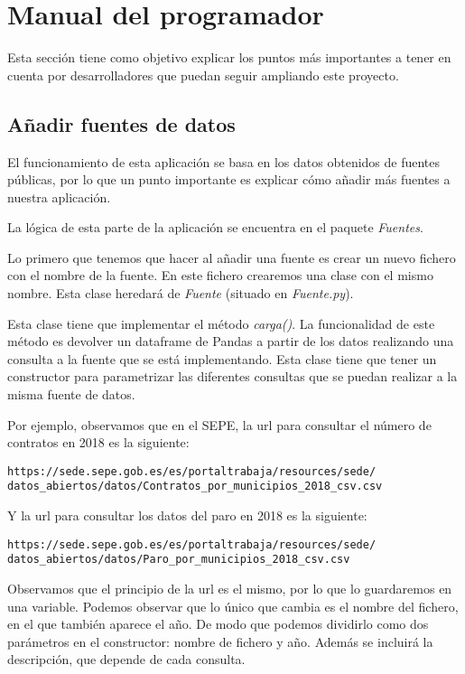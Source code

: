 \section{Manual del programador}

Esta sección tiene como objetivo explicar los puntos más importantes a tener en cuenta por desarrolladores que puedan seguir ampliando este proyecto.

\subsection{Añadir fuentes de datos}

El funcionamiento de esta aplicación se basa en los datos obtenidos de fuentes públicas, por lo que un punto importante es explicar cómo añadir más fuentes a nuestra aplicación.

La lógica de esta parte de la aplicación se encuentra en el paquete \textit{Fuentes}.

Lo primero que tenemos que hacer al añadir una fuente es crear un nuevo fichero con el nombre de la fuente. En este fichero crearemos una clase con el mismo nombre. Esta clase heredará de \textit{Fuente} (situado en \textit{Fuente.py}).

Esta clase tiene que implementar el método \textit{carga()}. La funcionalidad de este método es devolver un dataframe de Pandas a partir de los datos realizando una consulta a la fuente que se está implementando. Esta clase tiene que tener un constructor para parametrizar las diferentes consultas que se puedan realizar a la misma fuente de datos.

Por ejemplo, observamos que en el SEPE, la url para consultar el número de contratos en 2018 es la siguiente:

\begin{lstlisting}
https://sede.sepe.gob.es/es/portaltrabaja/resources/sede/
datos_abiertos/datos/Contratos_por_municipios_2018_csv.csv
\end{lstlisting}
Y la url para consultar los datos del paro en 2018 es la siguiente:

\begin{lstlisting}
https://sede.sepe.gob.es/es/portaltrabaja/resources/sede/
datos_abiertos/datos/Paro_por_municipios_2018_csv.csv
\end{lstlisting}

Observamos que el principio de la url es el mismo, por lo que lo guardaremos en una variable. Podemos observar que lo único que cambia es el nombre del fichero, en el que también aparece el año. De modo que podemos dividirlo como dos parámetros en el constructor: nombre de fichero y año. Además se incluirá la descripción, que depende de cada consulta.

